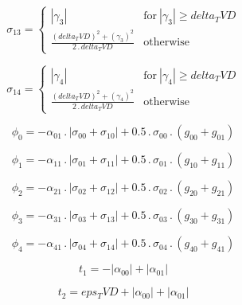 \documentclass{article}
\begin{document}
\begin{dmath}\sigma_{1 3} = \begin{cases} \left|{\gamma_{3}}\right| & \text{for}\: \left|{\gamma_{3}}\right| \geq delta_TVD \\\frac{\left(delta_TVD \right)^{2} + \left(\gamma_{3} \right)^{2}}{2 \,.\, delta_TVD} & \text{otherwise} 
\end{cases}\end{dmath}

\begin{dmath}\sigma_{1 4} = \begin{cases} \left|{\gamma_{4}}\right| & \text{for}\: \left|{\gamma_{4}}\right| \geq delta_TVD \\\frac{\left(delta_TVD \right)^{2} + \left(\gamma_{4} \right)^{2}}{2 \,.\, delta_TVD} & \text{otherwise} 
\end{cases}\end{dmath}

\begin{dmath}\phi_{0} = - \alpha_{01} \,.\, \left|{\sigma_{0 0} + \sigma_{1 0}}\right| + 0.5 \,.\, \sigma_{0 0} \,.\, \left(g_{00} + g_{01}\right)\end{dmath}

\begin{dmath}\phi_{1} = - \alpha_{11} \,.\, \left|{\sigma_{0 1} + \sigma_{1 1}}\right| + 0.5 \,.\, \sigma_{0 1} \,.\, \left(g_{10} + g_{11}\right)\end{dmath}

\begin{dmath}\phi_{2} = - \alpha_{21} \,.\, \left|{\sigma_{0 2} + \sigma_{1 2}}\right| + 0.5 \,.\, \sigma_{0 2} \,.\, \left(g_{20} + g_{21}\right)\end{dmath}

\begin{dmath}\phi_{3} = - \alpha_{31} \,.\, \left|{\sigma_{0 3} + \sigma_{1 3}}\right| + 0.5 \,.\, \sigma_{0 3} \,.\, \left(g_{30} + g_{31}\right)\end{dmath}

\begin{dmath}\phi_{4} = - \alpha_{41} \,.\, \left|{\sigma_{0 4} + \sigma_{1 4}}\right| + 0.5 \,.\, \sigma_{0 4} \,.\, \left(g_{40} + g_{41}\right)\end{dmath}

\begin{dmath}t_{1} = - \left|{\alpha_{00}}\right| + \left|{\alpha_{01}}\right|\end{dmath}

\begin{dmath}t_{2} = eps_TVD + \left|{\alpha_{00}}\right| + \left|{\alpha_{01}}\right|\end{dmath}
\end{document}
